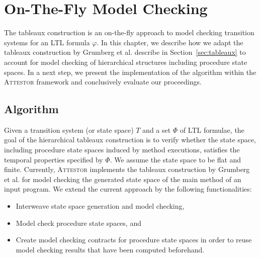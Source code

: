 \documentclass[a4paper, 12pt, twoside]{report}
\begin{document}
	\chapter{On-The-Fly Model Checking}\label{chp:otf}
	
	The tableaux construction is an on-the-fly approach to model checking transition systems for an LTL formula $\varphi$. In this chapter, we describe how we adapt the tableaux construction by Grumberg et al. describe in Section~\ref{sec:tableaux} to account for model checking of hierarchical structures including procedure state spaces. In a next step, we present the implementation of the algorithm within the \textsc{Attestor} framework and conclusively evaluate our proceedings.
	
	\section{Algorithm}
	
	Given a transition system (or state space) $T$ and a set $\Phi$ of LTL formulae, the goal of the hierarchical tableaux construction is to verify whether the state space, including procedure state spaces induced by method executions, satisfies the temporal properties specified by $\Phi$. We assume the state space to be flat and finite. Currently, \textsc{Attestor} implements the tableaux construction by Grumberg et al. for model checking the generated state space of the main method of an input program. We extend the current approach by the following functionalities:
	\begin{itemize}
		\item Interweave state space generation and model checking,
		\item Model check procedure state spaces, and
		\item Create model checking contracts for procedure state spaces in order to reuse model checking results that have been computed beforehand.
	\end{itemize}	
\end{document}
